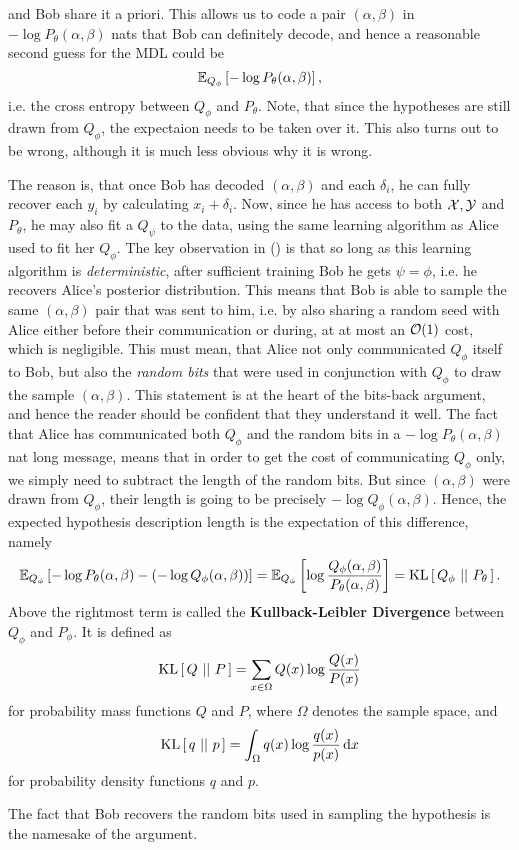 and Bob share it a priori. This allows us to code a pair $(\alpha, \beta)$ in
$-\log P_\theta(\alpha, \beta)$ nats that Bob can definitely decode, and hence a
reasonable second guess for the MDL could be
\begin{equation}
\label{eq:hypothesis_cross_entropy}
\Exp{-\log P_\theta(\alpha, \beta)}{Q_\phi},
\end{equation}
i.e. the cross entropy between $Q_\phi$ and $P_\theta$. Note, that since the
hypotheses are still drawn from $Q_\phi$, the expectaion needs to be taken over
it. This also turns out to be wrong, although it is much less obvious why it is wrong.
\par
The reason is, that once Bob has decoded $(\alpha, \beta)$ and each $\delta_i$,
he can fully recover each $y_i$ by calculating $x_i + \delta_i$. Now, since he
has access to both $\X, \Y$ and $P_\theta$, he may also fit a $Q_\psi$ to the
data, using the same learning algorithm as Alice used to fit her $Q_\phi$. The
key observation in (\cite{hinton1993keeping}) is that so long as this learning
algorithm is \textit{deterministic}, after sufficient training Bob he gets
$\psi = \phi$, i.e. he recovers Alice's posterior distribution. This means that
Bob is able to sample the same $(\alpha, \beta)$ pair that was sent to him, i.e.
by also sharing a random seed with Alice either before their communication or
during, at at most an $\Oh(1)$ cost, which is negligible. This must mean, that
Alice not only communicated $Q_\phi$ itself to Bob, but also the \textit{random
  bits} that were used in conjunction with $Q_\phi$ to draw the sample $(\alpha,
\beta)$. This statement is at the heart of the bits-back argument, and
hence the reader should be confident that they understand it well. The fact that
Alice has communicated both $Q_\phi$ and the random bits in a $-\log
P_\theta(\alpha, \beta)$ nat long message, means that in order to get the cost
of communicating $Q_\phi$ only, we simply need to subtract the length of the
random bits. But since $(\alpha, \beta)$ were drawn from $Q_\phi$, their length
is going to be precisely $-\log Q_\phi(\alpha, \beta)$. Hence, the expected
hypothesis description length is the expectation of this difference, namely
\[
  \Exp{-\log P_\theta (\alpha, \beta) - (-\log Q_\phi(\alpha, \beta))}{Q_\phi}
  =  \Exp{\log \frac{Q_\phi(\alpha, \beta)}{P_\theta (\alpha, \beta)}}{Q_\phi}
  = \KL{Q_\phi}{P_\theta}.
\]
Above the rightmost term is called the \textbf{Kullback-Leibler Divergence}
between $Q_\phi$ and $P_\phi$. It is defined as
\[
  \KL{Q}{P} = \sum_{x \in \Omega} Q(x)\log\frac{Q(x)}{P(x)}
\]
for probability mass functions $Q$ and $P$, where $\Omega$ denotes the sample
space, and
\[
  \KL{q}{p} = \int_\Omega q(x) \log\frac{q(x)}{p(x)} \d x
\]
for probability density functions $q$ and $p$.
\par
The fact that Bob recovers the random bits used in sampling the hypothesis is
the namesake of the argument.

